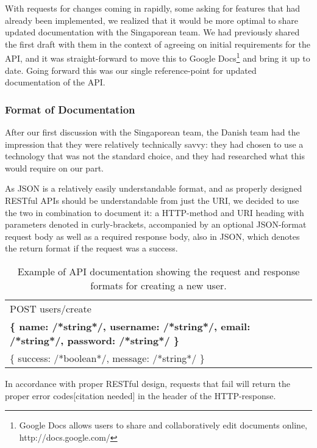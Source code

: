 With requests for changes coming in rapidly, some asking for features that had already been implemented, we
realized that it would be more optimal to share updated documentation with the Singaporean team. We had previously
shared the first draft with them in the context of agreeing on initial requirements for the API, and it was
straight-forward to move this to Google Docs\footnote{Google Docs allows users to share and collaboratively edit
documents online, http://docs.google.com/} and bring it up to date. Going forward this was our single
reference-point for updated documentation of the API.

\subsubsection{Format of Documentation}

After our first discussion with the Singaporean team, the Danish team had the impression that they were
relatively technically savvy: they had chosen to use a technology that was not the standard choice, and
they had researched what this would require on our part.

As JSON is a relatively easily understandable format, and as properly designed RESTful APIs should be
understandable from just the URI, we decided to use the two in combination to document it: a HTTP-method
and URI heading with parameters denoted in curly-brackets, accompanied by an optional JSON-format request
body as well as a required response body, also in JSON, which denotes the return format if the request was
a success.

\begin{table}[h]
    \begin{tabular}{ | l | }
        \hline
        POST users/create \\
        \textbf{\{ name: /*string*/, username: /*string*/, email: /*string*/, password: /*string*/ \}} \\
        \{ success: /*boolean*/, message: /*string*/ \} \\
        \hline
    \end{tabular}
    \caption{Example of API documentation showing the request and response formats for creating a new user.}
\end{table}


In accordance with proper RESTful design, requests that fail will return the proper error codes[citation
needed] in the header of the HTTP-response.

